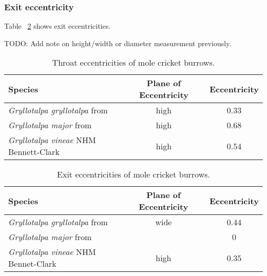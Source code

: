 \documentclass{article}
\begin{document}
   \subsubsection{Exit eccentricity} Table ~\ref{tab:exit_eccentricity} shows exit eccentricities. 
   
   
   TODO: Add note on height/width or diameter measurement previously.
   
      \begin{table}[h]
      	\begin{tabular}{|l|c|c|}
      		\hline 	Species &
		      		Plane of Eccentricity &
		      		Eccentricity \\ 
      		\hline  \textit{Gryllotalpa gryllotalpa} from \cite{jafari2015} &
		      		high &
		      		0.33  \\
      		\hline	\textit{Gryllotalpa major} from \cite{walker1990} &
		      		high &
		      		0.68 \\
		    \hline	\textit{Gryllotalpa vineae} NHM Bennett-Clark &
				    high &
					0.54 \\
      		\hline 
      	\end{tabular}
      	\caption{Throat eccentricities of mole cricket burrows.}
      	\label{tab:throat_eccentricity}
      \end{table} 
      
      \begin{table}[h]
      	\begin{tabular}{|l|c|c|}
      		\hline 	Species &
	      		Plane of Eccentricity &
	      		Eccentricity \\ 
      		\hline  \textit{Gryllotalpa gryllotalpa} from \cite{jafari2015} &
	      		wide &
	      		0.44  \\
      		\hline	\textit{Gryllotalpa major} from \cite{walker1990} &
	      		&
	      		0 \\
	      	\hline	\textit{Gryllotalpa vineae} NHM Bennet-Clark &
		      	high &
		      	0.35 \\
      		\hline 
      	\end{tabular}
      	\caption{Exit eccentricities of mole cricket burrows.}
      	\label{tab:exit_eccentricity}
      \end{table} 
   
\end{document}
